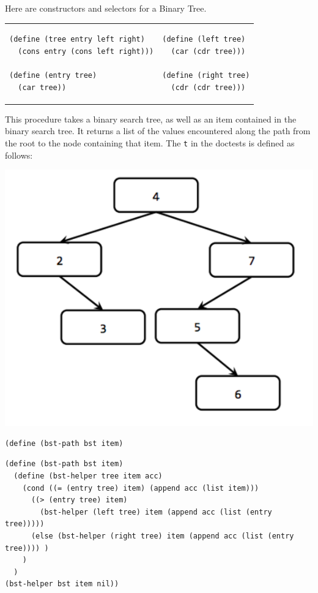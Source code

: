 \documentclass{exam}
\begin{document}
\begin{questions}
\item Here are constructors and selectors for a Binary Tree.

\begin{tabular}{m{9cm} m{7cm}}
\begin{lstlisting}
(define (tree entry left right)
  (cons entry (cons left right)))

(define (entry tree)
  (car tree))
  \end{lstlisting} & 
\begin{lstlisting}
(define (left tree)
  (car (cdr tree)))

(define (right tree)
  (cdr (cdr tree)))
  \end{lstlisting}

\end{tabular}

This procedure takes a binary search tree, as well as an item contained in the binary search tree. It returns a list of the values encountered along the path from the root to the node containing that item. The \texttt{t} in the doctests is defined as follows:
\begin{center}
 \includegraphics[scale=0.7]{bstPath}
\end{center}


\clearpage

\begin{lstlisting}[language=Scheme]
(define (bst-path bst item)
\end{lstlisting}

\begin{solution}[6cm]
\begin{lstlisting}
(define (bst-path bst item) 
  (define (bst-helper tree item acc)
    (cond ((= (entry tree) item) (append acc (list item)))
      ((> (entry tree) item) 
        (bst-helper (left tree) item (append acc (list (entry tree))))) 
      (else (bst-helper (right tree) item (append acc (list (entry tree)))) )
    )
  ) 
(bst-helper bst item nil))
\end{lstlisting}
\end{solution}
\end{questions}
\end{document}
